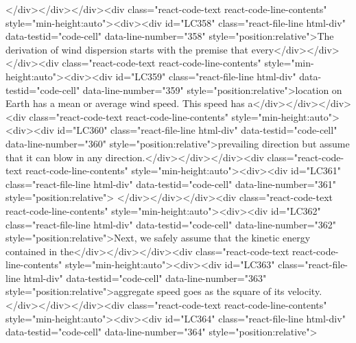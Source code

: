 {{{</div></div></div><div class="react-code-text react-code-line-contents" style="min-height:auto"><div><div id="LC358" class="react-file-line html-div" data-testid="code-cell" data-line-number="358" style="position:relative">The derivation of wind dispersion starts with the premise that every</div></div></div><div class="react-code-text react-code-line-contents" style="min-height:auto"><div><div id="LC359" class="react-file-line html-div" data-testid="code-cell" data-line-number="359" style="position:relative">location on Earth has a mean or average wind speed. This speed has a</div></div></div><div class="react-code-text react-code-line-contents" style="min-height:auto"><div><div id="LC360" class="react-file-line html-div" data-testid="code-cell" data-line-number="360" style="position:relative">prevailing direction but assume that it can blow in any direction.</div></div></div><div class="react-code-text react-code-line-contents" style="min-height:auto"><div><div id="LC361" class="react-file-line html-div" data-testid="code-cell" data-line-number="361" style="position:relative">
</div></div></div><div class="react-code-text react-code-line-contents" style="min-height:auto"><div><div id="LC362" class="react-file-line html-div" data-testid="code-cell" data-line-number="362" style="position:relative">Next, we safely assume that the kinetic energy contained in the</div></div></div><div class="react-code-text react-code-line-contents" style="min-height:auto"><div><div id="LC363" class="react-file-line html-div" data-testid="code-cell" data-line-number="363" style="position:relative">aggregate speed goes as the square of its velocity.</div></div></div><div class="react-code-text react-code-line-contents" style="min-height:auto"><div><div id="LC364" class="react-file-line html-div" data-testid="code-cell" data-line-number="364" style="position:relative">
}}}
